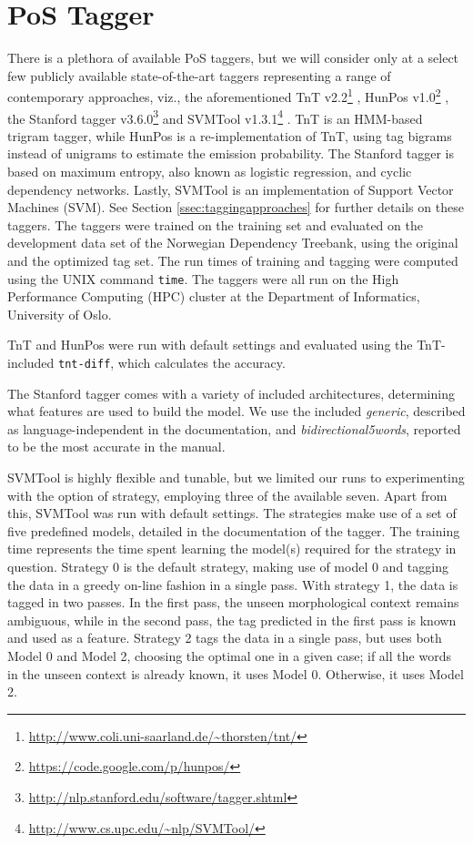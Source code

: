 \documentclass[a4paper,12pt,english]{book}
\begin{document}
\section{PoS Tagger}
There is a plethora of available PoS taggers, but we will consider only at a
select few publicly available state-of-the-art taggers representing a range of
contemporary approaches, viz., the aforementioned TnT
v2.2\footnote{\url{http://www.coli.uni-saarland.de/~thorsten/tnt/}}
\cite{Bra:00}, HunPos v1.0\footnote{\url{https://code.google.com/p/hunpos/}}
\cite{Hal:Kor:Ora:07}, the Stanford tagger
v3.6.0\footnote{\url{http://nlp.stanford.edu/software/tagger.shtml}}
\cite{Tou:Kle:Man:03} and SVMTool
v1.3.1\footnote{\url{http://www.cs.upc.edu/~nlp/SVMTool/}} \cite{Gim:Mar:04}.
TnT is an HMM-based trigram tagger, while HunPos is a re-implementation of TnT,
using tag bigrams instead of unigrams to estimate the emission probability. The
Stanford tagger is based on maximum entropy, also known as logistic regression,
and cyclic dependency networks. Lastly, SVMTool is an implementation of Support
Vector Machines (SVM). See Section \ref{ssec:taggingapproaches} for further
details on these taggers. The taggers were trained on the training set and
evaluated on the development data set of the Norwegian Dependency Treebank,
using the original and the optimized tag set. The run times of training and
tagging were computed using the UNIX command \texttt{time}. The taggers were
all run on the High Performance Computing (HPC) cluster at the Department of
Informatics, University of Oslo.

TnT and HunPos were run with default settings and evaluated using the
TnT-included \texttt{tnt-diff}, which calculates the accuracy.

The Stanford tagger comes with a variety of included architectures, determining
what features are used to build the model. We use the included \emph{generic},
described as language-independent in the documentation, and
\emph{bidirectional5words}, reported to be the most accurate in the manual.

SVMTool is highly flexible and tunable, but we limited our runs to
experimenting with the option of strategy, employing three of the available
seven. Apart from this, SVMTool was run with default settings. The strategies
make use of a set of five predefined models, detailed in the documentation of
the tagger. The training time represents the time spent learning the model(s)
required for the strategy in question. Strategy 0 is the default strategy,
making use of model 0 and tagging the data in a greedy on-line fashion in a
single pass. With strategy 1, the data is tagged in two passes. In the first
pass, the unseen morphological context remains ambiguous, while in the second
pass, the tag predicted in the first pass is known and used as a feature.
Strategy 2 tags the data in a single pass, but uses both Model 0 and Model 2,
choosing the optimal one in a given case; if all the words in the unseen
context is already known, it uses Model 0. Otherwise, it uses Model 2.
\end{document}
